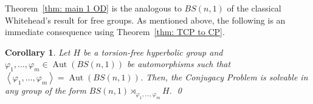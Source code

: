 \documentclass[english]{amsart}
\newtheorem{cor}[thm]{Corollary}
\theoremstyle{definition}
\newcommand\ZZ{\mathbb{Z}}
\newcommand{\Aut}{\operatorname{Aut}}
\newcommand{\gen}[1]{\left\langle#1\right\rangle}
\begin{document}
Theorem~\ref{thm: main 1 OD} is the analogous to $BS(n,1)$ of the classical Whitehead's result for free groups. As mentioned above, the following is an immediate consequence using Theorem~\ref{thm: TCP to CP}. 

\begin{cor}
Let $H$ be a torsion-free hyperbolic group and $\varphi_1,\ldots ,\varphi_m\in \Aut(BS(n,1))$ be automorphisms such that $\gen{\varphi_1,\ldots ,\varphi_m} =\Aut(BS(n,1))$. Then, the Conjugacy Problem is solvable in any group of the form $BS(n,1)\rtimes_{\varphi_1, \ldots ,\varphi_m} H$. \qed
\end{cor}





\end{document}
